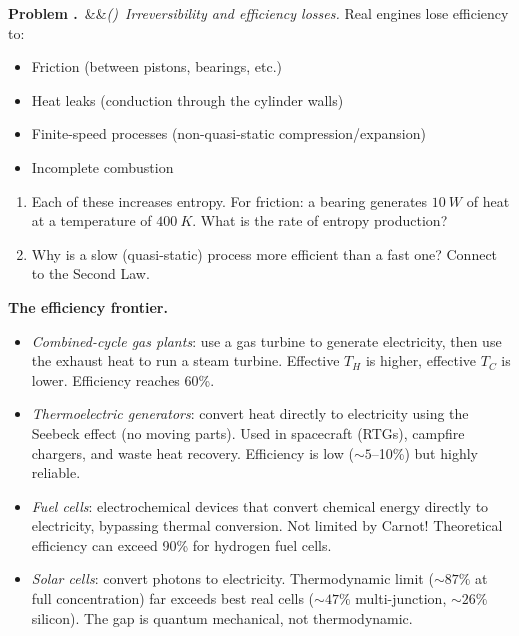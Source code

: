 \documentclass[12pt, a4paper, twoside]{book}
\newcounter{problem}[chapter]
\newcommand{\problem}[1][]{\refstepcounter{problem}\medskip\noindent
  \textcolor{accent}{\textbf{Problem \theproblem.}}\ \ifx&#1&\else\textit{(#1)}\ \fi}
\begin{document}
\begin{explobox}
\problem \textit{Irreversibility and efficiency losses.} Real engines lose efficiency to:
\begin{itemize}[leftmargin=1.5em,itemsep=1pt]
  \item Friction (between pistons, bearings, etc.)
  \item Heat leaks (conduction through the cylinder walls)
  \item Finite-speed processes (non-quasi-static compression/expansion)
  \item Incomplete combustion
\end{itemize}
\begin{enumerate}[label=(\alph*)]
  \item Each of these increases entropy. For friction: a bearing generates $\SI{10}{W}$ of heat at a temperature of $\SI{400}{K}$. What is the rate of entropy production?
  \item Why is a slow (quasi-static) process more efficient than a fast one? Connect to the Second Law.
\end{enumerate}
\end{explobox}

\begin{realworldbox}
\textbf{The efficiency frontier.}
\begin{itemize}[leftmargin=1.5em,itemsep=3pt]
  \item \textit{Combined-cycle gas plants}: use a gas turbine to generate electricity, then use the exhaust heat to run a steam turbine. Effective $T_H$ is higher, effective $T_C$ is lower. Efficiency reaches 60\%.
  \item \textit{Thermoelectric generators}: convert heat directly to electricity using the Seebeck effect (no moving parts). Used in spacecraft (RTGs), campfire chargers, and waste heat recovery. Efficiency is low ($\sim5$--10\%) but highly reliable.
  \item \textit{Fuel cells}: electrochemical devices that convert chemical energy directly to electricity, bypassing thermal conversion. Not limited by Carnot! Theoretical efficiency can exceed 90\% for hydrogen fuel cells.
  \item \textit{Solar cells}: convert photons to electricity. Thermodynamic limit ($\sim 87\%$ at full concentration) far exceeds best real cells ($\sim 47\%$ multi-junction, $\sim 26\%$ silicon). The gap is quantum mechanical, not thermodynamic.
\end{itemize}
\end{realworldbox}
\end{document}
